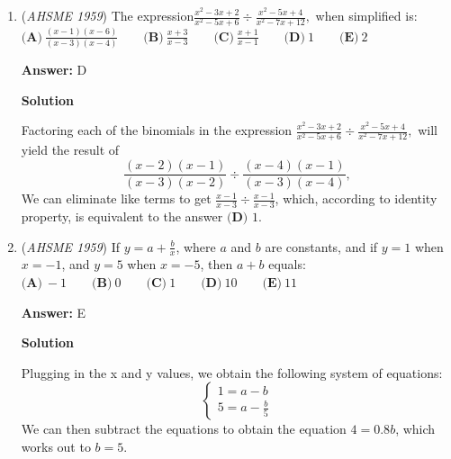\begin{enumerate}
 



\textbf{Solution 2 (Answer choices)}

Look at the options. Note that if $\textbf{(A)}$ is the correct answer, one of the acute angles of the triangle will measure to $15$ degrees. This implies that the other acute angle of the triangle would measure to be $75$ degrees, which would imply that $\textbf{(E)}$ is another correct answer. However, there is only one correct answer per question, so $\textbf{(A)}$ can't be a correct answer. Using a similar argument, neither $\textbf{(B)}$, $\textbf{(D)}$ , nor $\textbf{(E)}$ can be a correct answer. Since $\textbf{(C)}$ is the only answer choice left and there must be one correct answer, the answer must be $\boxed{\textbf{(C)}}$.

 


	\item (\textit{AHSME 1959}) The expression$\frac{x^2-3x+2}{x^2-5x+6}\div \frac{x^2-5x+4}{x^2-7x+12},$ when simplified is:
$\textbf{(A)}\ \frac{(x-1)(x-6)}{(x-3)(x-4)} \qquad\textbf{(B)}\ \frac{x+3}{x-3}\qquad\textbf{(C)}\ \frac{x+1}{x-1}\qquad\textbf{(D)}\ 1\qquad\textbf{(E)}\ 2$

 \textbf{Answer: }D



\textbf{Solution}

Factoring each of the binomials in the expression $\frac{x^2-3x+2}{x^2-5x+6}\div \frac{x^2-5x+4}{x^2-7x+12},$ will yield the result of 
 \[\frac{(x-2)(x-1)}{(x-3)(x-2)}\div \frac{(x-4)(x-1)}{(x-3)(x-4)},\]We can eliminate like terms to get $\frac {x-1}{x-3}\div \frac{x-1}{x-3}$, which, according to identity property, is equivalent to the answer $\boxed{\textbf{(D) }1}$.

 


	\item (\textit{AHSME 1959}) If $y=a+\frac{b}{x}$, where $a$ and $b$ are constants, and if $y=1$ when $x=-1$, and $y=5$ when $x=-5$, then $a+b$ equals:
$\textbf{(A)}\ -1 \qquad\textbf{(B)}\ 0\qquad\textbf{(C)}\ 1\qquad\textbf{(D)}\ 10\qquad\textbf{(E)}\ 11$

 \textbf{Answer: }E



\textbf{Solution}

Plugging in the x and y values, we obtain the following system of equations:
 \[\begin {cases} 1 = a - b \\ 5 = a - \frac{b}{5} \end {cases}\]We can then subtract the equations to obtain the equation $4 = 0.8b$, which works out to $b = 5$.


\end{enumerate}
